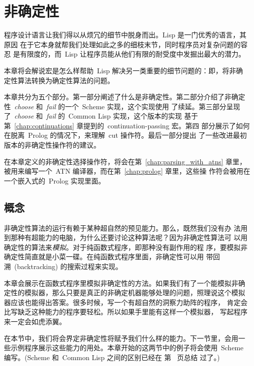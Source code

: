 
\chapter{非确定性}
\label{chap:nondeterminism}

程序设计语言让我们得以从烦冗的细节中脱身而出。Lisp 是一门优秀的语言，其原因
在于它本身就帮我们处理如此之多的细枝末节，同时程序员对复杂问题的容忍
是有限度的，而~Lisp 让程序员能从他们有限的耐受度中发掘出最大的潜力。

本章将会解说宏是怎么样帮助~Lisp 解决另一类重要的细节问题的：即，将非确
定性算法转换为确定性算法的问题。

本章共分为五个部分。第一部分阐述了什么是非确定性。第二部分介绍了非确定
性~\emph{choose} 和~\emph{fail} 的一个~Scheme 实现，这个实现使用
了续延。第三部分呈现
了~\emph{choose} 和~\emph{fail} 的~Common Lisp 实现，这个版本的实现
基于第~\ref{chap:continuations} 章提到的~continuation-passing 宏。第四
部分展示了如何在脱离~Prolog 的情况下，来理解~cut 操作符。最后一部分提出
了一些改进最初版本的非确定性操作符的建议。

在本章定义的非确定性选择操作符，将会在第~\ref{chap:parsing_with_atns}
章里，被用来编写一个~ATN 编译器，而在第~\ref{chap:prolog} 章里，这些操
作符会被用在一个嵌入式的~Prolog 实现里面。

\section{概念}
\label{sec:nondeterminism:the_concept}

非确定性算法的运行有赖于某种超自然的预见能力。那么，既然我们没有办
法用到那种有超能力的电脑，为什么还要讨论这种算法呢？因为非确定性算法可
以用确定性的算法来\emph{模拟}。对于纯函数式程序，即那种没有副作用的程
序，要模拟非确定性简直就是小菜一碟。在纯函数式程序里面，非确定性可以用
带回溯~(backtracking) 的搜索过程来实现。

本章会展示在函数式程序里模拟非确定性的方法。如果我们有了一个能模拟非确
定性的模拟器，那么只要是真正的非确定机器能够处理的问题，照理说这个模拟
器应该也能得出答案。很多时候，写一个有超自然的洞察力助阵的程序，
肯定会比写缺乏这种能力的程序要轻松。所以如果手里能有这样一个模拟器，
写起程序来一定会如虎添翼。

在本节中，我们将会界定非确定性将赋予我们什么样的能力。下一节里，会用一
些示例程序展示这些能力的用处。本章开始的这两节中的例子将会使用~Scheme
编写。(Scheme 和~Common Lisp 之间的区别已经在
第~\pageref{fig:some_differences_between_scheme_and_common_lisp} 页总结
过了。)

